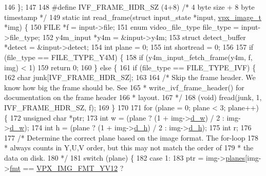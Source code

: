 \begin{DoxyCodeInclude}
{{146 \};
147 
148 \textcolor{preprocessor}{#define IVF\_FRAME\_HDR\_SZ (4+8) }\textcolor{comment}{/* 4 byte size + 8 byte timestamp */}\textcolor{preprocessor}{}
149 \textcolor{keyword}{static} \textcolor{keywordtype}{int} read\_frame(\textcolor{keyword}{struct} input\_state *input, \hyperlink{structvpx__image}{vpx\_image\_t} *img) \{
150   FILE *f = input->file;
151   \textcolor{keyword}{enum} video\_file\_type file\_type = input->file\_type;
152   y4m\_input *y4m = &input->y4m;
153   \textcolor{keyword}{struct }detect\_buffer *detect = &input->detect;
154   \textcolor{keywordtype}{int} plane = 0;
155   \textcolor{keywordtype}{int} shortread = 0;
156 
157   \textcolor{keywordflow}{if} (file\_type == FILE\_TYPE\_Y4M) \{
158     \textcolor{keywordflow}{if} (y4m\_input\_fetch\_frame(y4m, f, img) < 1)
159       \textcolor{keywordflow}{return} 0;
160   \} \textcolor{keywordflow}{else} \{
161     \textcolor{keywordflow}{if} (file\_type == FILE\_TYPE\_IVF) \{
162       \textcolor{keywordtype}{char} junk[IVF\_FRAME\_HDR\_SZ];
163 
164       \textcolor{comment}{/* Skip the frame header. We know how big the frame should be. See}
165 \textcolor{comment}{       * write\_ivf\_frame\_header() for documentation on the frame header}
166 \textcolor{comment}{       * layout.}
167 \textcolor{comment}{       */}
168       (void) fread(junk, 1, IVF\_FRAME\_HDR\_SZ, f);
169     \}
170 
171     \textcolor{keywordflow}{for} (plane = 0; plane < 3; plane++) \{
172       \textcolor{keywordtype}{unsigned} \textcolor{keywordtype}{char} *ptr;
173       \textcolor{keywordtype}{int} w = (plane ? (1 + img->\hyperlink{structvpx__image_a806bf23143bf00a0b3fdbd6ba030c483}{d\_w}) / 2 : img->\hyperlink{structvpx__image_a806bf23143bf00a0b3fdbd6ba030c483}{d\_w});
174       \textcolor{keywordtype}{int} h = (plane ? (1 + img->\hyperlink{structvpx__image_a31bc5f045d4f3c2b6bb0f57bb53078e7}{d\_h}) / 2 : img->\hyperlink{structvpx__image_a31bc5f045d4f3c2b6bb0f57bb53078e7}{d\_h});
175       \textcolor{keywordtype}{int} r;
176 
177       \textcolor{comment}{/* Determine the correct plane based on the image format. The for-loop}
178 \textcolor{comment}{       * always counts in Y,U,V order, but this may not match the order of}
179 \textcolor{comment}{       * the data on disk.}
180 \textcolor{comment}{       */}
181       \textcolor{keywordflow}{switch} (plane) \{
182         \textcolor{keywordflow}{case} 1:
183           ptr = img->\hyperlink{structvpx__image_ab6258308ba7a5f4a113348120e20e2ce}{planes}[img->\hyperlink{structvpx__image_a1d734f8afa9200a21c2d9f6bcf8c04d8}{fmt} == \hyperlink{vpx__image_8h_a7a30a7bff7400fb83ad45fede5077193a6e4e8961bbcf96478c300dc4c3e1dc18}{VPX\_IMG\_FMT\_YV12} ? 
}}
\end{DoxyCodeInclude}
